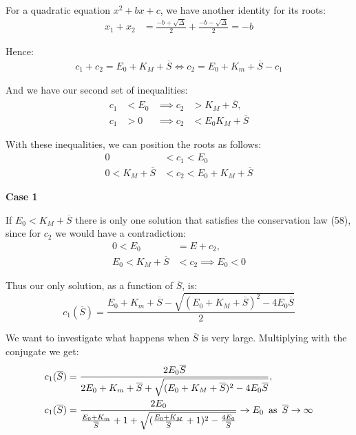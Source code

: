 \documentclass[12pt]{article}
\begin{document}
For a quadratic equation $x^2 + bx + c$, we have another identity for
its roots:
\begin{align}
  x_1 + x_2 &= \frac{-b + \sqrt{\Delta}}{2} + \frac{-b - \sqrt{\Delta}}{2} = -b
\end{align}

Hence:
\begin{align}
  c_1 + c_2 = E_0 + K_M + \overline{S} \iff c_2 = E_0 + K_m + \overline{S} - c_1
\end{align}

And we have our second set of inequalities:
\begin{align}
  c_1 &< E_0 &\implies c_2 &> K_M + \overline{S}, \\
  c_1 &> 0 &\implies c_2 &< E_0 K_M + \overline{S}
\end{align}

With these inequalities, we can position the roots as follows:
\begin{align}
  0 &< c_1 < E_0 \\
  0 < K_M + \overline{S} &< c_2 < E_0 + K_M + \overline{S}
\end{align}

\textbf{Case 1}

If $E_0 < K_M + \overline{S}$ there is only one solution that
satisfies the conservation law (58), since for $c_2$ we would have a
contradiction:
\begin{align}
  0 < E_0 &= E + c_2, \\
  E_0 < K_M + \overline{S} &< c_2 \implies E_0 < 0
\end{align}

Thus our only solution, as a function of $\overline{S}$, is:
\begin{equation}
  c_1(\overline{S}) = \frac{E_0 + K_m + \overline{S} - \sqrt{(E_0 +
      K_M + \overline{S})^2 - 4 E_0 \overline{S}}}{2}
\end{equation}

We want to investigate what happens when $\overline{S}$ is very
large. Multiplying with the conjugate we get:
\begin{align}
  c_1(\overline{S}) &= \frac{2 E_0 \overline{S}}{2 E_0 + K_m + \overline{S} +
    \sqrt{(E_0 +K_M + \overline{S})^2 - 4 E_0 \overline{S}}}, \\
  c_1(\overline{S}) &= \frac{2 E_0}{\frac{E_0 + K_m}{\overline{S}} + 1 +
    \sqrt{(\frac{E_0 + K_M}{\overline{S}} + 1)^2 - \frac{4 E_0}{\overline{S}}}}
  \to  E_0 \enskip \text{as} \enskip \overline{S} \to \infty
\end{align}
\end{document}
